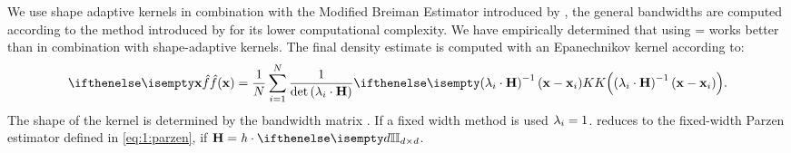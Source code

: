 
	We use shape adaptive kernels in combination with the Modified Breiman Estimator introduced by \textcite{wilkinson1995dataplot},
	the general bandwidths are computed according to the method introduced by \textcite{ferdosi2011comparison} for its lower computational complexity. 
	We have empirically determined that using \varMBESensitivityParam =  works better than  in combination with shape-adaptive kernels.
	The final density estimate is computed with an Epanechnikov kernel according to:
	\begin{equation}\label{eq:2:parzenWithBandWidthMatrix}
		\varEstimatedDensityFunction{\varPattern} = \frac{1}{\varNumPatterns}\sum_{\itXis = 1}^{\varNumPatterns} \frac{1}{\det\left(\varLocalBandwidth{\itXis} \cdot \varBandwidthMatrix\right)}\varKernel{\left(\varLocalBandwidth{\itXis} \cdot \varBandwidthMatrix\right)^{-1}\left(\varPattern - \varPattern[\itXis]\right)}.
	\end{equation}
	The shape of the kernel \varKernel{\bullet} is determined by the bandwidth matrix \varBandwidthMatrix. If a fixed width method is used $\lambda_{i} = 1$.  reduces to the fixed-width Parzen estimator defined in \cref{eq:1:parzen}, if $\varBandwidthMatrix = \varBandwidth \cdot \identityMatrix{\varDim}$.
	
